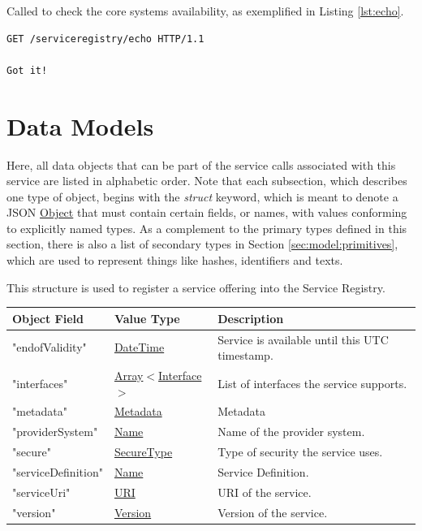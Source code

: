 \documentclass[a4paper]{arrowhead}
\newcommand{\fref}[1]{{\textcolor{ArrowheadBlue}{\hyperref[sec:functions:#1]{#1}}}}
\newcommand{\pref}[1]{{\textcolor{ArrowheadGrey}{\hyperref[sec:model:primitives:#1]{#1}}}}
\begin{document}

Called to check the core systems availability, as exemplified in Listing \ref{lst:echo}.

\begin{lstlisting}[language=http,label={lst:echo},caption={An \fref{Echo} invocation response.}]
GET /serviceregistry/echo HTTP/1.1

Got it!
\end{lstlisting}

\newpage

\section{Data Models}
\label{sec:model}

Here, all data objects that can be part of the service calls associated with this service are listed in alphabetic order.
Note that each subsection, which describes one type of object, begins with the \textit{struct} keyword, which is meant to denote a JSON \pref{Object} that must contain certain fields, or names, with values conforming to explicitly named types.
As a complement to the primary types defined in this section, there is also a list of secondary types in Section \ref{sec:model:primitives}, which are used to represent things like hashes, identifiers and texts.


This structure is used to register a service offering into the Service Registry.

\begin{table}[ht!]
\begin{tabularx}{\textwidth}{| p{4.25cm} | p{3.5cm} | X |} \hline
\rowcolor{gray!33} Object Field & Value Type      & Description \\ \hline
"endofValidity"                 & \pref{DateTime} & Service is available until this UTC timestamp. \\ \hline
"interfaces"                   & \pref{Array}$<$\pref{Interface}$>$     & List of interfaces the service supports. \\ \hline
"metadata"                  & \pref{Metadata}     & Metadata \\ \hline
"providerSystem"                    & \pref{Name} & Name of the provider system. \\ \hline
"secure"                    &\pref{SecureType}  & Type of security the service uses. \\ \hline
"serviceDefinition"         &\pref{Name}        & Service Definition. \\ \hline
"serviceUri"                &\pref{URI}         & URI of the service. \\ \hline
"version"                   &\pref{Version}     & Version of the service. \\ \hline
\end{tabularx}
\end{table}
\end{document}

